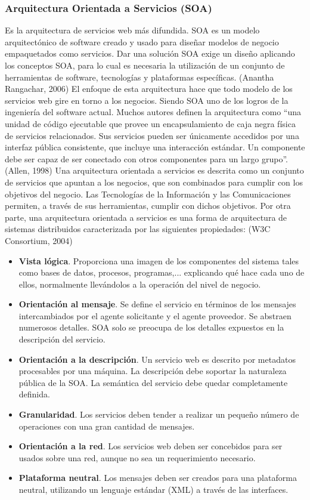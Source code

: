   \subsubsection{Arquitectura Orientada a Servicios (SOA)}
Es la arquitectura de servicios web más difundida. SOA es un modelo
arquitectónico de software creado y usado para diseñar modelos de negocio 
empaquetados como servicios. Dar una solución SOA exige un diseño aplicando 
los conceptos SOA, para lo cual es necesaria la utilización de un conjunto 
de herramientas de software, tecnologías y plataformas específicas. (Anantha 
Rangachar, 2006)
El enfoque de esta arquitectura hace que todo modelo de los servicios web 
gire en torno a los negocios. Siendo SOA uno de los logros de la ingeniería 
del software actual.
Muchos autores definen la arquitectura como “una unidad de código ejecutable 
que provee un encapsulamiento de caja negra física de servicios 
relacionados. Sus servicios pueden ser únicamente accedidos por una interfaz 
pública consistente, que incluye una interacción estándar. Un componente 
debe ser capaz de ser conectado con otros componentes para un largo grupo”. 
(Allen, 1998) Una arquitectura orientada a servicios es descrita como un 
conjunto de servicios que apuntan a los negocios, que son combinados para 
cumplir con los objetivos del negocio. Las Tecnologías de la Información y 
las Comunicaciones permiten, a través de sus herramientas, cumplir con 
dichos objetivos.
Por otra parte, una arquitectura orientada a servicios es una forma de 
arquitectura de sistemas distribuidos caracterizada por las siguientes 
propiedades: (W3C Consortium, 2004)
\begin{itemize}
\item \textbf{Vista lógica}. Proporciona una imagen de los componentes del 
sistema tales como bases de datos, procesos, programas,... explicando qué 
hace cada uno de ellos, normalmente llevándolos a la operación del nivel de 
negocio.
\item \textbf{Orientación al mensaje}. Se define el servicio en términos de 
los mensajes intercambiados por el agente solicitante y el agente proveedor. 
Se abstraen numerosos detalles. SOA solo se preocupa de los detalles 
expuestos en la descripción del servicio.
\item \textbf{Orientación a la descripción}. Un servicio web es descrito por 
metadatos procesables por una máquina. La descripción debe soportar la 
naturaleza pública de la SOA. La semántica del servicio debe quedar 
completamente definida.
\item \textbf{Granularidad}. Los servicios deben tender a realizar un 
pequeño número de operaciones con una gran cantidad de mensajes.
\item \textbf{Orientación a la red}. Los servicios web deben ser concebidos 
para ser usados sobre una red, aunque no sea un requerimiento necesario.
\item \textbf{Plataforma neutral}. Los mensajes deben ser creados para una 
plataforma neutral, utilizando un lenguaje estándar (XML) a través de las 
interfaces.
\end{itemize}


